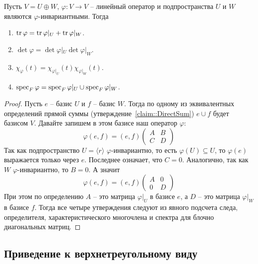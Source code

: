 \begin{claim}\label{claim::RestrictionChar}
Пусть $V = U\oplus W$, $\varphi\colon V\to V$ -- линейный оператор и подпространства $U$ и $W$ являются $\varphi$-инвариантными. Тогда
\begin{enumerate}
\item $\operatorname{tr} \varphi = \operatorname{tr} \varphi|_U + \operatorname{tr} \varphi|_W$.
\item $\det \varphi = \det \varphi|_U \det \varphi|_W$.
\item $\chi_\varphi(t) = \chi_{\varphi|_U}(t) \chi_{\varphi|_W}(t)$.
\item $\operatorname{spec}_F \varphi = \operatorname{spec}_F \varphi|_U \cup \operatorname{spec}_F \varphi|_W$.
\end{enumerate}
\end{claim}
\begin{proof}
Пусть $e$ -- базис $U$ и $f$ -- базис $W$. Тогда по одному из эквивалентных определений прямой суммы (утверждение~\ref{claim::DirectSum}) $e \cup f$ будет базисом $V$. Давайте запишем в этом базисе наш оператор $\varphi$:
\[
\varphi(e,f) = (e,f)
\begin{pmatrix}
{A}&{B}\\
{C}&{D}
\end{pmatrix}
\]
Так как подпространство $U =\langle r \rangle$ $\varphi$-инвариантно, то есть $\varphi(U)\subseteq U$, то $\varphi(e)$ выражается только через $e$. Последнее означает, что $C = 0$. Аналогично, так как $W$ $\varphi$-инвариантно, то $B = 0$. А значит
\[
\varphi(e,f) = (e,f)
\begin{pmatrix}
{A}&{0}\\
{0}&{D}
\end{pmatrix}
\]
При этом по определению $A$ -- это матрица $\varphi|_U$ в базисе $e$, а $D$ -- это матрица $\varphi|_W$ в базисе $f$. Тогда все четыре утверждения следуют из явного подсчета следа, определителя, характеристического многочлена и спектра для блочно диагональных матриц.
\end{proof}

\subsection{Приведение к верхнетреугольному виду}

